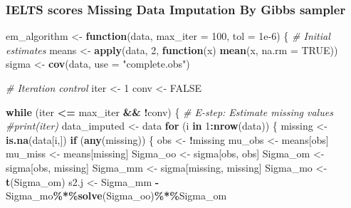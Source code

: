 \documentclass[12pt]{article}
\newenvironment{Shaded}{\begin{snugshade}}{\end{snugshade}}
\newcommand{\AttributeTok}[1]{\textcolor[rgb]{0.13,0.29,0.53}{#1}}
\newcommand{\CommentTok}[1]{\textcolor[rgb]{0.56,0.35,0.01}{\textit{#1}}}
\newcommand{\ConstantTok}[1]{\textcolor[rgb]{0.56,0.35,0.01}{#1}}
\newcommand{\ControlFlowTok}[1]{\textcolor[rgb]{0.13,0.29,0.53}{\textbf{#1}}}
\newcommand{\DecValTok}[1]{\textcolor[rgb]{0.00,0.00,0.81}{#1}}
\newcommand{\FloatTok}[1]{\textcolor[rgb]{0.00,0.00,0.81}{#1}}
\newcommand{\FunctionTok}[1]{\textcolor[rgb]{0.13,0.29,0.53}{\textbf{#1}}}
\newcommand{\NormalTok}[1]{#1}
\newcommand{\OtherTok}[1]{\textcolor[rgb]{0.56,0.35,0.01}{#1}}
\newcommand{\SpecialCharTok}[1]{\textcolor[rgb]{0.81,0.36,0.00}{\textbf{#1}}}
\newcommand{\StringTok}[1]{\textcolor[rgb]{0.31,0.60,0.02}{#1}}
\begin{document}
\subsubsection{IELTS scores Missing Data Imputation By Gibbs
sampler}\label{ielts-scores-missing-data-imputation-by-gibbs-sampler-1}

\begin{Shaded}
\begin{Highlighting}[]
\NormalTok{em\_algorithm }\OtherTok{\textless{}{-}} \ControlFlowTok{function}\NormalTok{(data, }\AttributeTok{max\_iter =} \DecValTok{100}\NormalTok{, }\AttributeTok{tol =} \FloatTok{1e{-}6}\NormalTok{) \{}
    \CommentTok{\# Initial estimates}
\NormalTok{    means }\OtherTok{\textless{}{-}} \FunctionTok{apply}\NormalTok{(data, }\DecValTok{2}\NormalTok{, }\ControlFlowTok{function}\NormalTok{(x) }\FunctionTok{mean}\NormalTok{(x, }\AttributeTok{na.rm =} \ConstantTok{TRUE}\NormalTok{))}
\NormalTok{    sigma }\OtherTok{\textless{}{-}} \FunctionTok{cov}\NormalTok{(data, }\AttributeTok{use =} \StringTok{"complete.obs"}\NormalTok{)}
  
    \CommentTok{\# Iteration control}
\NormalTok{    iter }\OtherTok{\textless{}{-}} \DecValTok{1}
\NormalTok{    conv }\OtherTok{\textless{}{-}} \ConstantTok{FALSE}

    \ControlFlowTok{while}\NormalTok{ (iter }\SpecialCharTok{\textless{}=}\NormalTok{ max\_iter }\SpecialCharTok{\&\&} \SpecialCharTok{!}\NormalTok{conv) \{}
        \CommentTok{\# E{-}step: Estimate missing values}
    \CommentTok{\#print(iter)}
\NormalTok{        data\_imputed }\OtherTok{\textless{}{-}}\NormalTok{ data}
        \ControlFlowTok{for}\NormalTok{ (i }\ControlFlowTok{in} \DecValTok{1}\SpecialCharTok{:}\FunctionTok{nrow}\NormalTok{(data)) \{}
\NormalTok{            missing }\OtherTok{\textless{}{-}} \FunctionTok{is.na}\NormalTok{(data[i,])}
            \ControlFlowTok{if}\NormalTok{ (}\FunctionTok{any}\NormalTok{(missing)) \{}
\NormalTok{                obs }\OtherTok{\textless{}{-}} \SpecialCharTok{!}\NormalTok{missing}
\NormalTok{                mu\_obs }\OtherTok{\textless{}{-}}\NormalTok{ means[obs]}
\NormalTok{                mu\_miss }\OtherTok{\textless{}{-}}\NormalTok{ means[missing]}
\NormalTok{                Sigma\_oo }\OtherTok{\textless{}{-}}\NormalTok{ sigma[obs, obs]}
\NormalTok{                Sigma\_om }\OtherTok{\textless{}{-}}\NormalTok{ sigma[obs, missing]}
\NormalTok{                Sigma\_mm }\OtherTok{\textless{}{-}}\NormalTok{ sigma[missing, missing]}
\NormalTok{                Sigma\_mo }\OtherTok{\textless{}{-}} \FunctionTok{t}\NormalTok{(Sigma\_om)}
\NormalTok{            s2.j   }\OtherTok{\textless{}{-}}\NormalTok{ Sigma\_mm }\SpecialCharTok{{-}}\NormalTok{ Sigma\_mo}\SpecialCharTok{\%*\%}\FunctionTok{solve}\NormalTok{(Sigma\_oo)}\SpecialCharTok{\%*\%}\NormalTok{Sigma\_om}
                

\end{Highlighting}
\end{Shaded}
\end{document}
